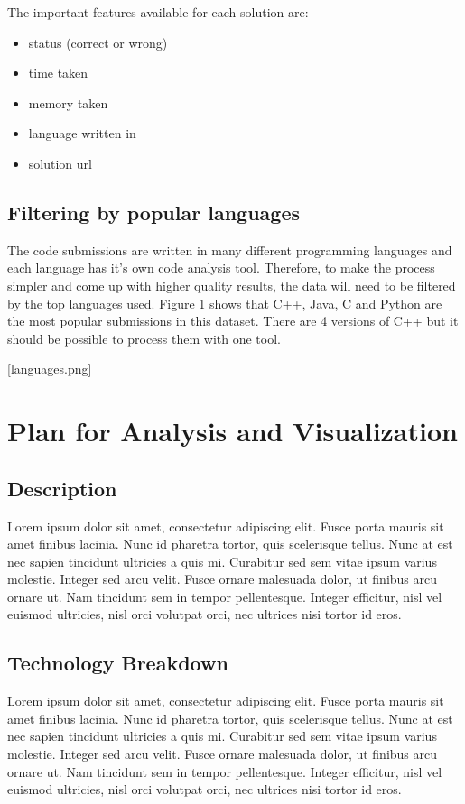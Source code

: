 \documentclass{article}
\begin{document}
The important features available for each solution are:

\begin{itemize}
\item
  status (correct or wrong)
\item
  time taken
\item
  memory taken
\item
  language written in
\item
  solution url
\end{itemize}

\subsection{Filtering by popular
languages}\label{filtering-by-popular-languages}

The code submissions are written in many different programming languages
and each language has it's own code analysis tool. Therefore, to make
the process simpler and come up with higher quality results, the data
will need to be filtered by the top languages used. Figure 1 shows that
C++, Java, C and Python are the most popular submissions in this
dataset. There are 4 versions of C++ but it should be possible to
process them with one tool.

{[}languages.png{]} \citet{KaggleKernal}

\section{Plan for Analysis and
Visualization}\label{plan-for-analysis-and-visualization}

\subsection{Description}\label{description}

Lorem ipsum dolor sit amet, consectetur adipiscing elit. Fusce porta
mauris sit amet finibus lacinia. Nunc id pharetra tortor, quis
scelerisque tellus. Nunc at est nec sapien tincidunt ultricies a quis
mi. Curabitur sed sem vitae ipsum varius molestie. Integer sed arcu
velit. Fusce ornare malesuada dolor, ut finibus arcu ornare ut. Nam
tincidunt sem in tempor pellentesque. Integer efficitur, nisl vel
euismod ultricies, nisl orci volutpat orci, nec ultrices nisi tortor id
eros.

\subsection{Technology Breakdown}\label{technology-breakdown}

Lorem ipsum dolor sit amet, consectetur adipiscing elit. Fusce porta
mauris sit amet finibus lacinia. Nunc id pharetra tortor, quis
scelerisque tellus. Nunc at est nec sapien tincidunt ultricies a quis
mi. Curabitur sed sem vitae ipsum varius molestie. Integer sed arcu
velit. Fusce ornare malesuada dolor, ut finibus arcu ornare ut. Nam
tincidunt sem in tempor pellentesque. Integer efficitur, nisl vel
euismod ultricies, nisl orci volutpat orci, nec ultrices nisi tortor id
eros.



\end{document}
